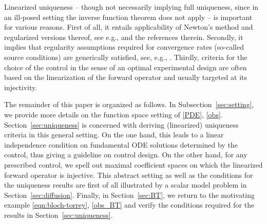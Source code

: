 \documentclass[12pt]{article}
\begin{document}
Linearized uniqueness -- though not necessarily implying full uniqueness, since in an ill-posed setting the inverse function theorem does not apply -- is important for various reasons.
First of all, it entails applicability of Newton's method and regularized versions thereof, see e.g., \cite{BakKok04,KNSbook:2008} and the references therein. 
Secondly, it implies that regularity assumptions required for convergence rates (so-called source conditions) are generically satisfied, see, e.g., \cite{Flemming2018}.
Thirdly, criteria for the choice of the control in the sense of an optimal experimental design \cite{Alexanderian2021,Koerkeletal,Pukelsheim} are often based on the linearization of the forward operator and usually targeted at its injectivity. 

\medskip

The remainder of this paper is organized as follows.
In Subsection~\ref{sec:setting}, we provide more details on the function space setting of \eqref{PDE}, \eqref{obs}. 
Section~\ref{sec:uniqueness} is concerned with deriving (linearized) uniqueness criteria in this general setting. On the one hand, this leads to a linear independence condition on fundamental ODE solutions determined by the control, thus giving a guideline on control design. On the other hand, for any prescribed control, we spell out maximal coefficient spaces on which the linearized forward operator is injective. 
This abstract setting as well as the conditions for the uniqueness results are  first of all illustrated by a scalar model problem in Section~\ref{sec:diffusion}.
Finally, in Section~\ref{sec:BT}, we return to the motivating example \eqref{eqn:bloch-torrey}, \eqref{obs_BT} and verify the conditions required for the results in Section~\ref{sec:uniqueness}.
\end{document}
